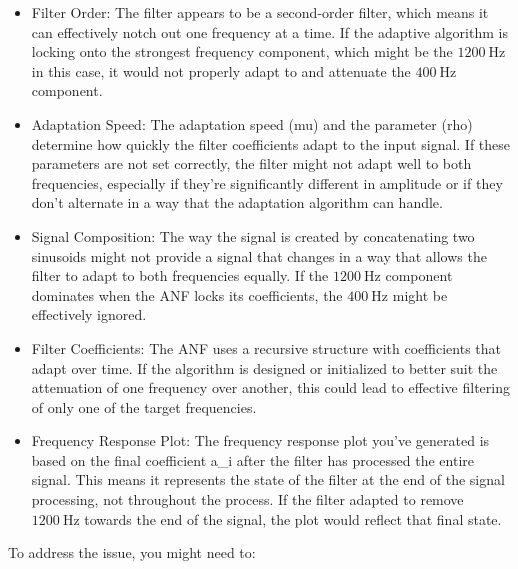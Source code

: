 \begin{itemize}
  \item Filter Order: The filter appears to be a second-order filter, which means it can effectively notch out one frequency at a time. If the adaptive algorithm is locking onto the strongest frequency component, which might be the $1200 \mathrm{~Hz}$ in this case, it would not properly adapt to and attenuate the $400 \mathrm{~Hz}$ component.
  \item Adaptation Speed: The adaptation speed (mu) and the parameter (rho) determine how quickly the filter coefficients adapt to the input signal. If these parameters are not set correctly, the filter might not adapt well to both frequencies, especially if they're significantly different in amplitude or if they don't alternate in a way that the adaptation algorithm can handle.
  \item Signal Composition: The way the signal is created by concatenating two sinusoids might not provide a signal that changes in a way that allows the filter to adapt to both frequencies equally. If the $1200 \mathrm{~Hz}$ component dominates when the ANF locks its coefficients, the $400 \mathrm{~Hz}$ might be effectively ignored.
  \item Filter Coefficients: The ANF uses a recursive structure with coefficients that adapt over time. If the algorithm is designed or initialized to better suit the attenuation of one frequency over another, this could lead to effective filtering of only one of the target frequencies.
  \item Frequency Response Plot: The frequency response plot you've generated is based on the final coefficient a\_i after the filter has processed the entire signal. This means it represents the state of the filter at the end of the signal processing, not throughout the process. If the filter adapted to remove $1200 \mathrm{~Hz}$ towards the end of the signal, the plot would reflect that final state.
\end{itemize}

To address the issue, you might need to:

